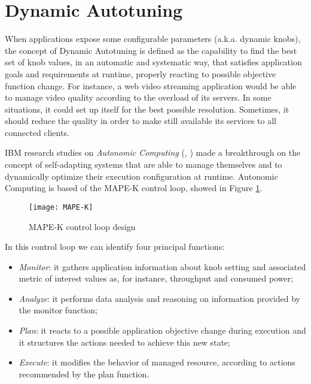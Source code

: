 \section{Dynamic Autotuning}

When applications expose some configurable parameters (a.k.a. dynamic knobs), the concept of Dynamic Autotuning is defined as the capability to find the best set of knob values, in an automatic and systematic way, that satisfies application goals and requirements at runtime, properly reacting to possible objective function change. For instance, a web video streaming application would be able to manage video quality according to the overload of its servers. In some situations, it could set up itself for the best possible resolution. Sometimes, it should reduce the quality in order to make still available its services to all connected clients.

IBM research studies on \textit{Autonomic Computing} (\cite{kephart2003vision}, \cite{computing2006architectural}) made a breakthrough on the concept of self-adapting systems that are able to manage themselves and to dynamically optimize their execution configuration at runtime. Autonomic Computing is based of the MAPE-K control loop, showed in Figure \ref{fig::mape-k}.

\begin{figure}[htb]

    \centering
    \texttt{[image: MAPE-K]}
    \caption{MAPE-K control loop design}
    \label{fig::mape-k}

\end{figure}

In this control loop we can identify four principal functions:

\begin{itemize}

    \item \textit{Monitor}: it gathers application information about knob setting and associated metric of interest values as, for instance, throughput and consumed power;
    
    \item \textit{Analyze}: it performs data analysis and reasoning on information provided by the monitor function;
    
    \item \textit{Plan}: it reacts to a possible application objective change during execution and it structures the actions needed to achieve this new state;
    
    \item \textit{Execute}: it modifies the behavior of managed resource, according to actions recommended by the plan function.

\end{itemize}

